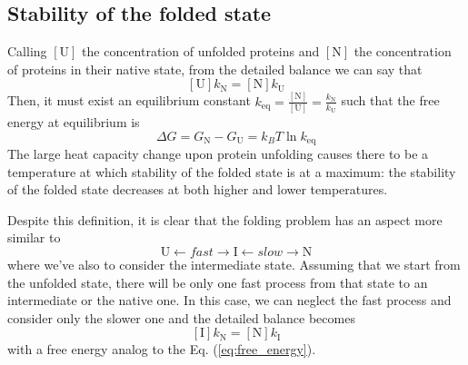\subsection{Stability of the folded state}
Calling $\left[\text{U}\right]$ the concentration of unfolded proteins and $\left[\text{N}\right]$ the concentration of proteins in their native state, from the detailed balance we can say that
\begin{equation*}
    \left[\text{U}\right]k_\text{N} = \left[\text{N}\right]k_\text{U}
\end{equation*}
Then, it must exist an equilibrium constant $k_\text{eq} = \frac{\left[\text{N}\right]}{\left[\text{U}\right]} = \frac{k_\text{N}}{k_\text{U}}$ such that the free energy at equilibrium is
\begin{equation}
    \Delta G = G_{\text{N}} - G_{\text{U}} = k_BT\ln k_\text{eq}
    \label{eq:free_energy}
\end{equation}
The large heat capacity change upon protein unfolding causes there to be a temperature at which stability of the folded state is at a maximum: the stability of the folded state decreases at both higher and lower temperatures.

Despite this definition, it is clear that the folding problem has an aspect more similar to
\begin{equation*}
    \text{U} \leftarrow fast \rightarrow \text{I} \leftarrow slow \rightarrow \text{N}
\end{equation*}
where we've also to consider the intermediate state.
Assuming that we start from the unfolded state, there will be only one fast process from that state to an intermediate or the native one.
In this case, we can neglect the fast process and consider only the slower one and the detailed balance becomes
\begin{equation*}
    \left[\text{I}\right]k_\text{N} = \left[\text{N}\right]k_\text{I}
\end{equation*}
with a free energy analog to the Eq. (\ref{eq:free_energy}).